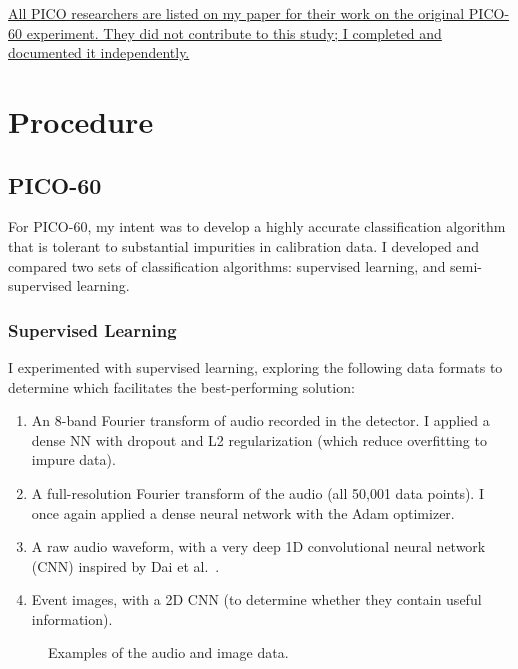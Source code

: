 \documentclass[12pt]{article}
\begin{document}
\ul{All PICO researchers are listed on my paper for their work on the original PICO-60 experiment. They did not contribute to this study; I completed and documented it independently.}

\section{Procedure}

\subsection{PICO-60}

For PICO-60, my intent was to develop a highly accurate classification algorithm that is tolerant to substantial impurities in calibration data. I developed and compared two sets of classification algorithms: supervised learning, and semi-supervised learning.

\subsubsection{Supervised Learning}

I experimented with supervised learning, exploring the following data formats to determine which facilitates the best-performing solution:

\begin{enumerate}
    \item An 8-band Fourier transform of audio recorded in the detector. I applied a dense NN with dropout \cite{dropout} and L2 regularization (which reduce overfitting to impure data).
    \item A full-resolution Fourier transform of the audio (all 50,001 data points). I once again applied a dense neural network with the Adam \cite{adam} optimizer.
    \item A raw audio waveform, with a very deep 1D convolutional neural network (CNN) inspired by Dai et al.\ \cite{verydeepconvnets}.
    \item Event images, with a 2D CNN (to determine whether they contain useful information).
\end{enumerate}

\begin{figure}[ht]
    \centering
    \qquad
    \caption{Examples of the audio and image data.}
\end{figure}
\end{document}
